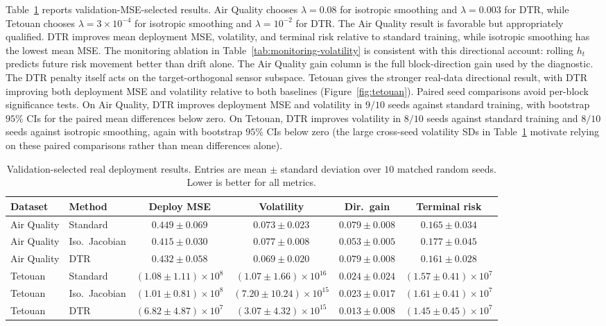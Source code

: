 \documentclass[conference]{IEEEtran}
\begin{document}
Table~\ref{tab:real-results} reports validation-MSE-selected results. Air Quality chooses $\lambda=0.08$ for isotropic smoothing and $\lambda=0.003$ for DTR, while Tetouan chooses $\lambda=3\times10^{-4}$ for isotropic smoothing and $\lambda=10^{-2}$ for DTR. The Air Quality result is favorable but appropriately qualified. DTR improves mean deployment MSE, volatility, and terminal risk relative to standard training, while isotropic smoothing has the lowest mean MSE. The monitoring ablation in Table~\ref{tab:monitoring-volatility} is consistent with this directional account: rolling $h_t$ predicts future risk movement better than drift alone. The Air Quality gain column is the full block-direction gain used by the diagnostic. The DTR penalty itself acts on the target-orthogonal sensor subspace. Tetouan gives the stronger real-data directional result, with DTR improving both deployment MSE and volatility relative to both baselines (Figure~\ref{fig:tetouan}). Paired seed comparisons avoid per-block significance tests. On Air Quality, DTR improves deployment MSE and volatility in $9/10$ seeds against standard training, with bootstrap $95\%$ CIs for the paired mean differences below zero. On Tetouan, DTR improves volatility in $8/10$ seeds against standard training and $8/10$ seeds against isotropic smoothing, again with bootstrap $95\%$ CIs below zero (the large cross-seed volatility SDs in Table~\ref{tab:real-results} motivate relying on these paired comparisons rather than mean differences alone).

\begin{table}[t]
\caption{Validation-selected real deployment results. Entries are mean $\pm$ standard deviation over $10$ matched random seeds. Lower is better for all metrics.}
\centering
\setlength{\tabcolsep}{4pt}
\scriptsize
\begin{tabular}{llcccc}
\toprule
Dataset & Method & Deploy MSE & Volatility & Dir.\ gain & Terminal risk \\
\midrule
Air Quality & Standard & $0.449\pm0.069$ & $0.073\pm0.023$ & $0.079\pm0.008$ & $0.165\pm0.034$ \\
Air Quality & Iso.\ Jacobian & $0.415\pm0.030$ & $0.077\pm0.008$ & $0.053\pm0.005$ & $0.177\pm0.045$ \\
Air Quality & DTR & $0.432\pm0.058$ & $0.069\pm0.020$ & $0.079\pm0.008$ & $0.161\pm0.028$ \\
\addlinespace
Tetouan & Standard & $(1.08\pm1.11)\!\times\!10^8$ & $(1.07\pm1.66)\!\times\!10^{16}$ & $0.024\pm0.024$ & $(1.57\pm0.41)\!\times\!10^7$ \\
Tetouan & Iso.\ Jacobian & $(1.01\pm0.81)\!\times\!10^8$ & $(7.20\pm10.24)\!\times\!10^{15}$ & $0.023\pm0.017$ & $(1.61\pm0.41)\!\times\!10^7$ \\
Tetouan & DTR & $(6.82\pm4.87)\!\times\!10^7$ & $(3.07\pm4.32)\!\times\!10^{15}$ & $0.013\pm0.008$ & $(1.45\pm0.45)\!\times\!10^7$ \\
\bottomrule
\end{tabular}
\label{tab:real-results}
\end{table}
\end{document}
